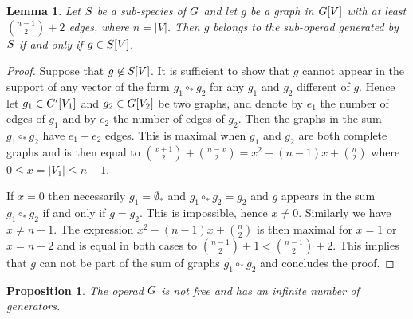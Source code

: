 \documentclass[11pt]{article}
\newtheorem{lemma}[theo]{Lemma}
\newtheorem{prop}[theo]{Proposition}
\theoremstyle{definition}
\numberwithin{equation}{section}
\newcommand{\spe}[1]{\normalfont{\textsc{#1}}}
\newcommand{\card}[1]{|#1|}
\newcommand{\comp}[1][\ast]{\circ_{#1}}
\newcommand{\G}{\spe{G}}
\begin{document}
\begin{lemma} \label{lem:infinite_number_generators_G}
    Let $\spe{S}$ be a sub-species of $\G$ and let $g$ be a graph in $\G[V]$ with at least $\binom{n-1}{2} +2$ 
    edges, where $n = \card{V}$. Then $g$ belongs to the sub-operad generated by $\spe{S}$ if and only if $g\in\spe{S}[V]$.
\end{lemma}

\begin{proof}
    Suppose that $g\not\in\spe{S}[V]$. It is sufficient to show that $g$ cannot appear in the support of any 
    vector of the form $g_1\comp g_2$ for any $g_1$ and $g_2$ different of $g$. Hence let $g_1\in \G'[V_1]$ 
    and $g_2\in \G[V_2]$ be two graphs, and denote by $e_1$ the number of edges of $g_1$ and by $e_2$ the 
    number of edges of $g_2$. Then the graphs in the sum $g_1\comp g_2$ have $e_1+e_2$ edges. This is maximal
    when $g_1$ and $g_2$ are both complete graphs and is then equal to 
    $\binom{x+1}{2}+\binom{n-x}{2} = x^2-(n-1)x+\binom{n}{2}$ where $0\leq x=\card{V_1}\leq n-1$.

    If $x = 0$ then necessarily $g_1 =\emptyset_{\ast}$ and $g_1\comp g_2 = g_2$ and $g$ appears in the sum 
    $g_1\comp g_2$ if and only if $g=g_2$. This is impossible, hence $x\not = 0$. Similarly we have 
    $x\not = n-1$. The expression $x^2-(n-1)x+\binom{n}{2}$ is then maximal for $x=1$ or $x=n-2$ and is 
    equal in both cases to $\binom{n-1}{2}+1<\binom{n-1}{2} +2$. This implies that $g$ can not be part of the 
    sum of graphs $g_1\comp g_2$ and concludes the proof.
\end{proof}

\begin{prop} \label{gc} 
    The operad $\G$ is not free and has an infinite number of generators.
\end{prop}
\end{document}
